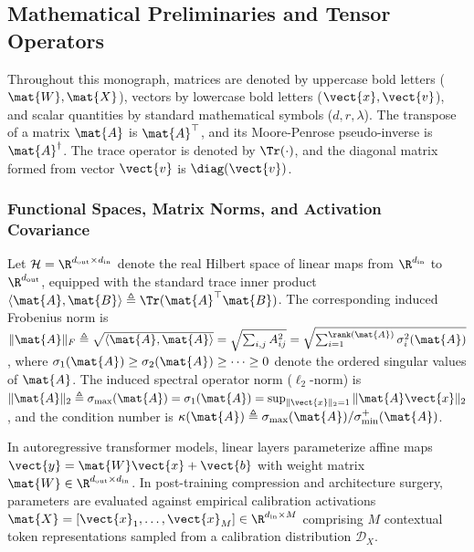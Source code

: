 \subsection{Mathematical Preliminaries and Tensor Operators}
\label{sec:math_preliminaries}

Throughout this monograph, matrices are denoted by uppercase bold letters ($\mat{W}, \mat{X}$), vectors by lowercase bold letters ($\vect{x}, \vect{v}$), and scalar quantities by standard mathematical symbols ($d, r, \lambda$). The transpose of a matrix $\mat{A}$ is $\mat{A}^\top$, and its Moore-Penrose pseudo-inverse is $\mat{A}^\dagger$. The trace operator is denoted by $\Tr(\cdot)$, and the diagonal matrix formed from vector $\vect{v}$ is $\diag(\vect{v})$.

\subsubsection{Functional Spaces, Matrix Norms, and Activation Covariance}
Let $\mathcal{H} = \R^{d_{\text{out}} \times d_{\text{in}}}$ denote the real Hilbert space of linear maps from $\R^{d_{\text{in}}}$ to $\R^{d_{\text{out}}}$, equipped with the standard trace inner product $\langle \mat{A}, \mat{B} \rangle \triangleq \Tr(\mat{A}^\top \mat{B})$. The corresponding induced Frobenius norm is $\|\mat{A}\|_F \triangleq \sqrt{\langle \mat{A}, \mat{A} \rangle} = \sqrt{\sum_{i,j} A_{ij}^2} = \sqrt{\sum_{i=1}^{\rank(\mat{A})} \sigma_i^2(\mat{A})}$, where $\sigma_1(\mat{A}) \ge \sigma_2(\mat{A}) \ge \dots \ge 0$ denote the ordered singular values of $\mat{A}$. The induced spectral operator norm ($\ell_2$-norm) is $\|\mat{A}\|_2 \triangleq \sigma_{\max}(\mat{A}) = \sigma_1(\mat{A}) = \sup_{\|\vect{x}\|_2 = 1} \|\mat{A}\vect{x}\|_2$, and the condition number is $\kappa(\mat{A}) \triangleq \sigma_{\max}(\mat{A}) / \sigma_{\min}^+(\mat{A})$.

In autoregressive transformer models, linear layers parameterize affine maps $\vect{y} = \mat{W} \vect{x} + \vect{b}$ with weight matrix $\mat{W} \in \R^{d_{\text{out}} \times d_{\text{in}}}$. In post-training compression and architecture surgery, parameters are evaluated against empirical calibration activations $\mat{X} = [\vect{x}_1, \dots, \vect{x}_M] \in \R^{d_{\text{in}} \times M}$ comprising $M$ contextual token representations sampled from a calibration distribution $\mathcal{D}_X$.

